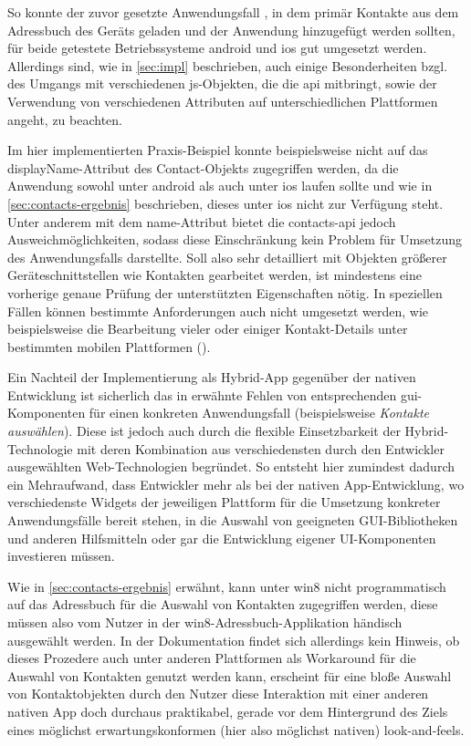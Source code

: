 So konnte der zuvor gesetzte Anwendungsfall , in dem primär Kontakte aus dem Adressbuch des Geräts geladen und der Anwendung hinzugefügt werden sollten, für beide getestete Betriebssysteme \gls{android} und \gls{ios} gut umgesetzt werden. 
Allerdings sind, wie in \autoref{sec:impl} beschrieben, auch einige Besonderheiten bzgl. des Umgangs mit verschiedenen \gls{js}-Objekten, die die api mitbringt, sowie der Verwendung von verschiedenen Attributen auf unterschiedlichen Plattformen angeht, zu beachten.

Im hier implementierten Praxis-Beispiel konnte beispielsweise nicht auf das displayName-Attribut des Contact-Objekts zugegriffen werden, da die Anwendung sowohl unter android als auch unter ios laufen sollte und wie in \autoref{sec:contacts-ergebnis} beschrieben, dieses unter ios nicht zur Verfügung steht. Unter anderem mit dem name-Attribut bietet die contacts-api jedoch Ausweichmöglichkeiten, sodass diese Einschränkung kein Problem für Umsetzung des Anwendungsfalls darstellte.
Soll also sehr detailliert mit Objekten größerer Geräteschnittstellen wie \zB Kontakten gearbeitet werden, ist mindestens eine vorherige genaue Prüfung der unterstützten Eigenschaften nötig. In speziellen Fällen können bestimmte Anforderungen auch nicht umgesetzt werden, wie beispielsweise die Bearbeitung vieler oder einiger Kontakt-Details unter bestimmten mobilen Plattformen ().

Ein Nachteil der Implementierung als Hybrid-App gegenüber der nativen Entwicklung ist sicherlich das in  erwähnte Fehlen von entsprechenden \gls{gui}-Komponenten für einen konkreten Anwendungsfall (beispielsweise \emph{Kontakte auswählen}). 
Diese ist jedoch auch durch die flexible Einsetzbarkeit der Hybrid-Technologie mit deren Kombination aus verschiedensten durch den Entwickler ausgewählten Web-Technologien begründet. 
So entsteht hier zumindest dadurch ein Mehraufwand, dass Entwickler mehr als bei der nativen App-Entwicklung, wo verschiedenste Widgets der jeweiligen Plattform für die Umsetzung konkreter Anwendungsfälle bereit stehen, in die Auswahl von geeigneten GUI-Bibliotheken und anderen Hilfsmitteln oder gar die Entwicklung eigener UI-Komponenten investieren müssen.

Wie in \autoref{sec:contacts-ergebnis} erwähnt, kann unter \gls{win8} nicht programmatisch auf das Adressbuch für die Auswahl von Kontakten zugegriffen werden, diese müssen also vom Nutzer in der \gls{win8}-Adressbuch-Applikation händisch ausgewählt werden.
In der Dokumentation findet sich allerdings kein Hinweis, ob dieses Prozedere auch unter anderen Plattformen als Workaround für die Auswahl von Kontakten genutzt werden kann, erscheint für eine bloße Auswahl von Kontaktobjekten durch den Nutzer diese Interaktion mit einer anderen nativen App doch durchaus praktikabel, gerade vor dem Hintergrund des Ziels eines möglichst erwartungskonformen (hier also möglichst nativen) \glspl{look-and-feel}. 

